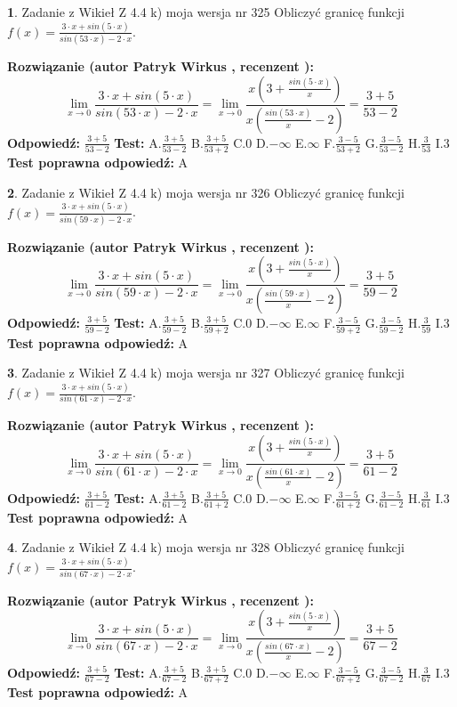 \documentclass[12pt, a4paper]{article}
\theoremstyle{definition} %
\newtheorem{zad}{}
\newcommand{\zadStart}[1]{\begin{zad}#1\newline}
\newcommand{\zadStop}{\end{zad}}
\newcommand{\rozwStart}[2]{\noindent \textbf{Rozwiązanie (autor #1 , recenzent #2): }\newline}
\newcommand{\rozwStop}{\newline}
\newcommand{\odpStart}{\noindent \textbf{Odpowiedź:}\newline}
\newcommand{\odpStop}{\newline}
\newcommand{\testStart}{\noindent \textbf{Test:}\newline}
\newcommand{\testStop}{\newline}
\newcommand{\kluczStart}{\noindent \textbf{Test poprawna odpowiedź:}\newline}
\newcommand{\kluczStop}{\newline}
\begin{document}
\zadStart{Zadanie z Wikieł Z 4.4 k) moja wersja nr 325}
Obliczyć granicę funkcji $f(x)=\frac{3\cdot x +sin(5\cdot x)}{sin(53\cdot x) -2\cdot x}$.
\zadStop
\rozwStart{Patryk Wirkus}{}
$$\lim\limits_{x\to 0}\frac{3\cdot x +sin(5\cdot x)}{sin(53\cdot x) -2\cdot x}
=\lim\limits_{x\to 0}\frac{x(3+\frac{sin(5\cdot x)}{x})}{x(\frac{sin(53\cdot x)}{x}-2)}
=\frac{3+5}{53-2}$$
\rozwStop
\odpStart
$\frac{3+5}{53-2}$
\odpStop
\testStart
A.$\frac{3+5}{53-2}$
B.$\frac{3+5}{53+2}$
C.$0$
D.$-\infty$
E.$\infty$
F.$\frac{3-5}{53+2}$
G.$\frac{3-5}{53-2}$
H.$\frac{3}{53}$
I.$3$
\testStop
\kluczStart
A
\kluczStop



\zadStart{Zadanie z Wikieł Z 4.4 k) moja wersja nr 326}
Obliczyć granicę funkcji $f(x)=\frac{3\cdot x +sin(5\cdot x)}{sin(59\cdot x) -2\cdot x}$.
\zadStop
\rozwStart{Patryk Wirkus}{}
$$\lim\limits_{x\to 0}\frac{3\cdot x +sin(5\cdot x)}{sin(59\cdot x) -2\cdot x}
=\lim\limits_{x\to 0}\frac{x(3+\frac{sin(5\cdot x)}{x})}{x(\frac{sin(59\cdot x)}{x}-2)}
=\frac{3+5}{59-2}$$
\rozwStop
\odpStart
$\frac{3+5}{59-2}$
\odpStop
\testStart
A.$\frac{3+5}{59-2}$
B.$\frac{3+5}{59+2}$
C.$0$
D.$-\infty$
E.$\infty$
F.$\frac{3-5}{59+2}$
G.$\frac{3-5}{59-2}$
H.$\frac{3}{59}$
I.$3$
\testStop
\kluczStart
A
\kluczStop



\zadStart{Zadanie z Wikieł Z 4.4 k) moja wersja nr 327}
Obliczyć granicę funkcji $f(x)=\frac{3\cdot x +sin(5\cdot x)}{sin(61\cdot x) -2\cdot x}$.
\zadStop
\rozwStart{Patryk Wirkus}{}
$$\lim\limits_{x\to 0}\frac{3\cdot x +sin(5\cdot x)}{sin(61\cdot x) -2\cdot x}
=\lim\limits_{x\to 0}\frac{x(3+\frac{sin(5\cdot x)}{x})}{x(\frac{sin(61\cdot x)}{x}-2)}
=\frac{3+5}{61-2}$$
\rozwStop
\odpStart
$\frac{3+5}{61-2}$
\odpStop
\testStart
A.$\frac{3+5}{61-2}$
B.$\frac{3+5}{61+2}$
C.$0$
D.$-\infty$
E.$\infty$
F.$\frac{3-5}{61+2}$
G.$\frac{3-5}{61-2}$
H.$\frac{3}{61}$
I.$3$
\testStop
\kluczStart
A
\kluczStop



\zadStart{Zadanie z Wikieł Z 4.4 k) moja wersja nr 328}
Obliczyć granicę funkcji $f(x)=\frac{3\cdot x +sin(5\cdot x)}{sin(67\cdot x) -2\cdot x}$.
\zadStop
\rozwStart{Patryk Wirkus}{}
$$\lim\limits_{x\to 0}\frac{3\cdot x +sin(5\cdot x)}{sin(67\cdot x) -2\cdot x}
=\lim\limits_{x\to 0}\frac{x(3+\frac{sin(5\cdot x)}{x})}{x(\frac{sin(67\cdot x)}{x}-2)}
=\frac{3+5}{67-2}$$
\rozwStop
\odpStart
$\frac{3+5}{67-2}$
\odpStop
\testStart
A.$\frac{3+5}{67-2}$
B.$\frac{3+5}{67+2}$
C.$0$
D.$-\infty$
E.$\infty$
F.$\frac{3-5}{67+2}$
G.$\frac{3-5}{67-2}$
H.$\frac{3}{67}$
I.$3$
\testStop
\kluczStart
A
\kluczStop
\end{document}
